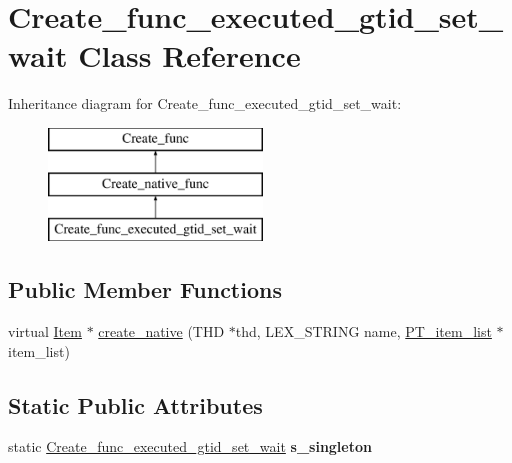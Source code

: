 \hypertarget{classCreate__func__executed__gtid__set__wait}{}\section{Create\+\_\+func\+\_\+executed\+\_\+gtid\+\_\+set\+\_\+wait Class Reference}
\label{classCreate__func__executed__gtid__set__wait}
Inheritance diagram for Create\+\_\+func\+\_\+executed\+\_\+gtid\+\_\+set\+\_\+wait\+:\begin{figure}[H]
\begin{center}
\leavevmode
\includegraphics[height=3.000000cm]{classCreate__func__executed__gtid__set__wait}
\end{center}
\end{figure}
\subsection*{Public Member Functions}
\begin{DoxyCompactItemize}
\item 
virtual \mbox{\hyperlink{classItem}{Item}} $\ast$ \mbox{\hyperlink{classCreate__func__executed__gtid__set__wait_a40744208e09a3966d613f6f2c684cca4}{create\+\_\+native}} (T\+HD $\ast$thd, L\+E\+X\+\_\+\+S\+T\+R\+I\+NG name, \mbox{\hyperlink{classPT__item__list}{P\+T\+\_\+item\+\_\+list}} $\ast$item\+\_\+list)
\end{DoxyCompactItemize}
\subsection*{Static Public Attributes}
\begin{DoxyCompactItemize}
\item 
\mbox{\label{classCreate__func__executed__gtid__set__wait_a71608dda0184ef914c93f4ad1b8d0d1b}} 
static \mbox{\hyperlink{classCreate__func__executed__gtid__set__wait}{Create\+\_\+func\+\_\+executed\+\_\+gtid\+\_\+set\+\_\+wait}} {\bfseries s\+\_\+singleton}
\end{DoxyCompactItemize}
